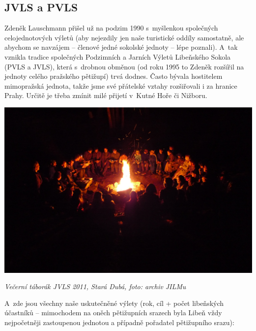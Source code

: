 \documentclass[a5paper, 11pt, twoside]{article}
\begin{document}
\subsection{JVLS a PVLS}

Zdeněk Lauschmann přišel už na podzim 1990 s~myšlenkou společných
celojednotových výletů (aby nejezdily jen naše turistické oddíly
samostatně, ale abychom se navzájem -- členové jedné sokolské jednoty --
lépe poznali). A~tak vznikla tradice společných Podzimních a Jarních
Výletů Libeňského Sokola (PVLS a JVLS), která s~drobnou obměnou (od roku
1995 to Zdeněk rozšířil na jednoty celého pražského pětižupí) trvá
dodnes. Často bývala hostitelem mimopražská jednota, takže jsme své
přátelské vztahy rozšiřovali i za hranice Prahy. Určitě je třeba zmínit
milé přijetí v~Kutné Hoře či Nižboru.

 \includegraphics[width=\textwidth]{img/38_jvls_taborak.JPG}

\textit{Večerní táborák JVLS 2011, Stará Dubá, foto: archiv JILMu}

A~zde jsou všechny naše uskutečněné výlety (rok, cíl + počet libeňských
účastníků -- mimochodem na oněch pětižupních srazech byla Libeň vždy
nejpočetněji zastoupenou jednotou a případně pořadatel pětižupního
srazu):
\end{document}
